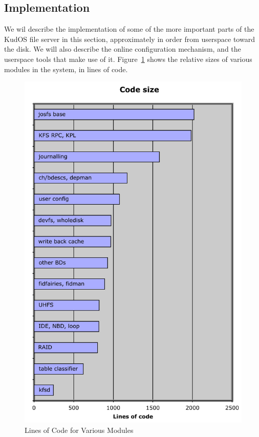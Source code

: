 \subsection{Implementation}
\label{sec:solution:impl}

We wil describe the implementation of some of the more important parts of the
KudOS file server in this section, approximately in order from userspace toward
the disk. We will also describe the online configuration mechanism, and the
userspace tools that make use of it. Figure~\ref{fig:loc} shows the relative
sizes of various modules in the system, in lines of code.

\begin{figure}[htb]
\begin{center}
  \includegraphics[scale=0.5]{loc_graph}
  \caption{Lines of Code for Various Modules}
  \label{fig:loc}
\end{center}
\end{figure}

